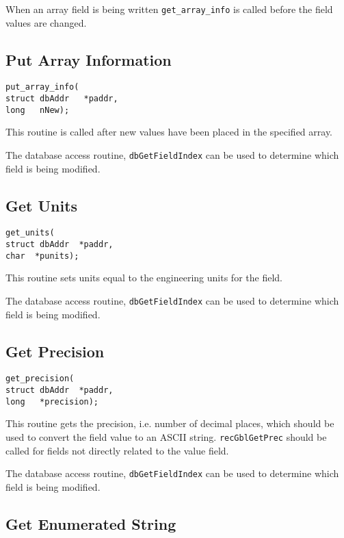 When an array field is being written \verb|get_array_info| is called before the field values are changed.

\subsection{Put Array Information}

\begin{verbatim}put_array_info(
struct dbAddr   *paddr,
long   nNew);
\end{verbatim}This routine is called after new values have been placed in the specified array.

The database access routine, \verb|dbGetFieldIndex| can be used to determine which field is being modified.

\subsection{Get Units}

\begin{verbatim}get_units(
struct dbAddr  *paddr,
char  *punits);
\end{verbatim}This routine sets units equal to the engineering units for the field.

The database access routine, \verb|dbGetFieldIndex| can be used to determine which field is being modified.

\subsection{Get Precision}

\begin{verbatim}get_precision(
struct dbAddr  *paddr,
long   *precision);
\end{verbatim}This routine gets the precision, i.e. number of decimal places, which should be used to convert the field value to an ASCII 
string. \verb|recGblGetPrec| should be called for fields not directly related to the value field.

The database access routine, \verb|dbGetFieldIndex| can be used to determine which field is being modified.

\subsection{Get Enumerated String}

